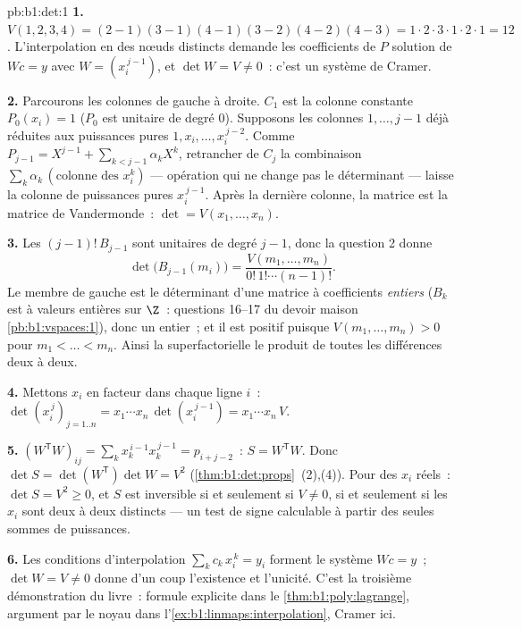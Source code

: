 \begin{solution}{pb:b1:det:1}
\textbf{1.} $V(1,2,3,4) = (2-1)(3-1)(4-1)(3-2)(4-2)(4-3) = 1
\cdot 2\cdot 3\cdot 1\cdot 2\cdot 1 = 12$. L'interpolation en des
nœuds distincts demande les coefficients de $P$ solution de $W c =
y$ avec $W = (x_i^{\,j-1})$, et $\det W = V \neq 0$~: c'est un système
de Cramer.

\textbf{2.} Parcourons les colonnes de gauche à droite. $C_1$
est la colonne constante $P_0(x_i) = 1$ ($P_0$ est unitaire de degré
$0$). Supposons les colonnes $1, \dots, j-1$ déjà réduites
aux puissances pures $1, x_i, \dots, x_i^{\,j-2}$. Comme $P_{j-1}
= X^{j-1} + \sum_{k < j-1}\alpha_k X^k$, retrancher de $C_j$
la combinaison $\sum_k \alpha_k\,(\text{colonne des } x_i^k)$
--- opération qui ne change pas le déterminant --- laisse
la colonne de puissances pures $x_i^{\,j-1}$. Après la dernière
colonne, la matrice est la matrice de Vandermonde~:
$\det = V(x_1, \dots, x_n)$.

\textbf{3.} Les  $(j-1)!\,B_{j-1}$ sont unitaires de
degré $j - 1$, donc la question 2 donne
\[
\det\bigl(B_{j-1}(m_i)\bigr)
= \frac{V(m_1, \dots, m_n)}{0!\,1!\cdots(n-1)!} .
\]
Le membre de gauche est le déterminant d'une matrice à coefficients
\emph{entiers} ($B_k$ est à valeurs entières sur $\Z$~: questions
16--17 du devoir maison \cref{pb:b1:vspaces:1}), donc un entier~;
et il est positif puisque $V(m_1, \dots, m_n) > 0$ pour $m_1 <
\dots < m_n$. Ainsi la superfactorielle  le produit de toutes
les différences deux à deux.

\textbf{4.} Mettons $x_i$ en facteur dans chaque ligne $i$~:
$\det(x_i^{\,j})_{j = 1..n} = x_1\cdots x_n\,
\det(x_i^{\,j-1}) = x_1\cdots x_n\,V$.

\textbf{5.} $(W^{\mathsf T}W)_{ij} = \sum_k x_k^{\,i-1}
x_k^{\,j-1} = p_{i+j-2}$~: $S = W^{\mathsf T}W$. Donc $\det S =
\det(W^{\mathsf T})\det W = V^2$
(\cref{thm:b1:det:props}~(2),(4)). Pour des $x_i$ réels~: $\det S = V^2
\geq 0$, et $S$ est inversible si et seulement si $V \neq 0$, si et
seulement si les $x_i$ sont deux à deux distincts --- un test de signe
calculable à partir des seules sommes de puissances.

\textbf{6.} Les conditions d'interpolation $\sum_{k}
c_k\,x_i^{\,k} = y_i$ forment le système $Wc = y$~; $\det W = V \neq
0$ donne d'un coup l'existence et l'unicité. C'est la troisième
démonstration du livre~: formule explicite dans
le \cref{thm:b1:poly:lagrange}, argument par le noyau dans
l'\cref{ex:b1:linmaps:interpolation}, Cramer ici.


\end{solution}
